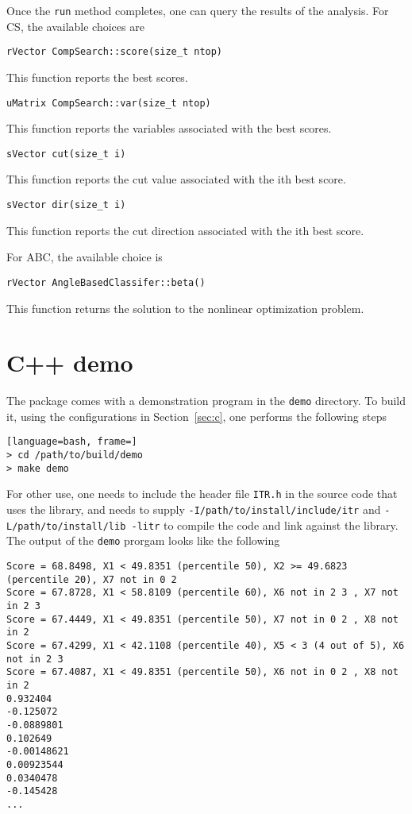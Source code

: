 Once the {\tt run} method completes, one can query the results of the analysis.
For CS, the available choices are
\begin{lstlisting}
rVector CompSearch::score(size_t ntop)
\end{lstlisting}
This function reports the best scores. 
\begin{lstlisting}
uMatrix CompSearch::var(size_t ntop)
\end{lstlisting}
This function reports the variables associated with the best scores. 
\begin{lstlisting}
sVector cut(size_t i)
\end{lstlisting}
This function reports the cut value associated with the ith best score. 
\begin{lstlisting}
sVector dir(size_t i) 
\end{lstlisting}
This function reports the cut direction associated with the ith best score.

For ABC, the available choice is
\begin{lstlisting}
rVector AngleBasedClassifer::beta()
\end{lstlisting}
This function returns the solution to the nonlinear optimization problem. 

\section{C++ demo}

The package comes with a demonstration program in the {\tt demo} directory.
To build it, using the configurations in Section~\ref{sec:c}, one performs
the following steps
\begin{lstlisting}[language=bash, frame=]
> cd /path/to/build/demo
> make demo
\end{lstlisting}
For other use, one needs to include the header file {\tt ITR.h} in the source
code that uses the library, and needs to supply
{\tt -I/path/to/install/include/itr} and {\tt -L/path/to/install/lib -litr}
to compile the code and link against the library. The output of the {\tt demo}
prorgam looks like the following
\begin{lstlisting}
Score = 68.8498, X1 < 49.8351 (percentile 50), X2 >= 49.6823 (percentile 20), X7 not in 0 2 
Score = 67.8728, X1 < 58.8109 (percentile 60), X6 not in 2 3 , X7 not in 2 3 
Score = 67.4449, X1 < 49.8351 (percentile 50), X7 not in 0 2 , X8 not in 2 
Score = 67.4299, X1 < 42.1108 (percentile 40), X5 < 3 (4 out of 5), X6 not in 2 3 
Score = 67.4087, X1 < 49.8351 (percentile 50), X6 not in 0 2 , X8 not in 2 
0.932404
-0.125072
-0.0889801
0.102649
-0.00148621
0.00923544
0.0340478
-0.145428
...
\end{lstlisting}

